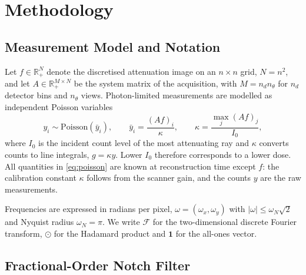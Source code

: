 \section{Methodology}
\label{sec:method}

\subsection{Measurement Model and Notation}
\label{sec:model}

Let $f\in\mathbb{R}_{+}^{N}$ denote the discretised attenuation image on an
$n\times n$ grid, $N=n^{2}$, and let $A\in\mathbb{R}_{+}^{M\times N}$ be the
system matrix of the acquisition, with $M=n_{d}n_{\theta}$ for $n_{d}$
detector bins and $n_{\theta}$ views. Photon-limited measurements are modelled
as independent Poisson variables
\begin{equation}
  y_{i}\sim\mathrm{Poisson}\!\left(\bar{y}_{i}\right),\qquad
  \bar{y}_{i}=\frac{(Af)_{i}}{\kappa},\qquad
  \kappa=\frac{\max_{j}(Af)_{j}}{I_{0}},
  \label{eq:poisson}
\end{equation}
where $I_{0}$ is the incident count level of the most attenuating ray and
$\kappa$ converts counts to line integrals, $g=\kappa y$. Lower $I_{0}$
therefore corresponds to a lower dose. All quantities in
\eqref{eq:poisson} are known at reconstruction time except $f$: the
calibration constant $\kappa$ follows from the scanner gain, and the counts
$y$ are the raw measurements.

Frequencies are expressed in radians per pixel, $\omega=(\omega_{x},
\omega_{y})$ with $|\omega|\le\omega_{N}\sqrt{2}$ and Nyquist radius
$\omega_{N}=\pi$. We write $\mathcal{F}$ for the two-dimensional discrete
Fourier transform, $\odot$ for the Hadamard product and $\mathbf{1}$ for the
all-ones vector.

\subsection{Fractional-Order Notch Filter}
\label{sec:filter}


